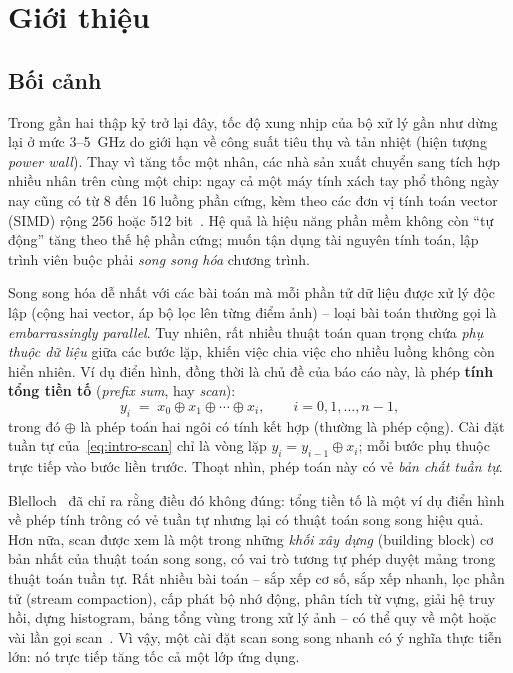 \chapter{Giới thiệu}
\label{ch:intro}

\section{Bối cảnh}

Trong gần hai thập kỷ trở lại đây, tốc độ xung nhịp của bộ xử lý gần như dừng lại ở mức
3--5~GHz do giới hạn về công suất tiêu thụ và tản nhiệt (hiện tượng \emph{power wall}).
Thay vì tăng tốc một nhân, các nhà sản xuất chuyển sang tích hợp nhiều nhân trên cùng một chip:
ngay cả một máy tính xách tay phổ thông ngày nay cũng có từ 8 đến 16 luồng phần cứng, kèm theo
các đơn vị tính toán vector (SIMD) rộng 256 hoặc 512 bit~\cite{hennessy2019}. Hệ quả là hiệu
năng phần mềm không còn ``tự động'' tăng theo thế hệ phần cứng; muốn tận dụng tài nguyên tính
toán, lập trình viên buộc phải \emph{song song hóa} chương trình.

Song song hóa dễ nhất với các bài toán mà mỗi phần tử dữ liệu được xử lý độc lập (cộng hai
vector, áp bộ lọc lên từng điểm ảnh) -- loại bài toán thường gọi là \emph{embarrassingly
parallel}. Tuy nhiên, rất nhiều thuật toán quan trọng chứa \emph{phụ thuộc dữ liệu} giữa các
bước lặp, khiến việc chia việc cho nhiều luồng không còn hiển nhiên. Ví dụ điển hình, đồng
thời là chủ đề của báo cáo này, là phép \textbf{tính tổng tiền tố} (\emph{prefix sum},
hay \emph{scan}):
\begin{equation}
  y_i \;=\; x_0 \oplus x_1 \oplus \cdots \oplus x_i, \qquad i = 0, 1, \ldots, n-1,
  \label{eq:intro-scan}
\end{equation}
trong đó \(\oplus\) là phép toán hai ngôi có tính kết hợp (thường là phép cộng). Cài đặt tuần
tự của~\eqref{eq:intro-scan} chỉ là vòng lặp \(y_i = y_{i-1} \oplus x_i\); mỗi bước phụ thuộc
trực tiếp vào bước liền trước. Thoạt nhìn, phép toán này có vẻ \emph{bản chất tuần tự}.

Blelloch~\cite{blelloch1990} đã chỉ ra rằng điều đó không đúng: tổng tiền tố là một ví dụ
điển hình về phép tính trông có vẻ tuần tự nhưng lại có thuật toán song song hiệu quả. Hơn
nữa, scan được xem là một trong những \emph{khối xây dựng} (building block) cơ bản nhất của
thuật toán song song, có vai trò tương tự phép duyệt mảng trong thuật toán tuần tự. Rất nhiều
bài toán -- sắp xếp cơ số, sắp xếp nhanh, lọc phần tử (stream compaction), cấp phát bộ nhớ
động, phân tích từ vựng, giải hệ truy hồi, dựng histogram, bảng tổng vùng trong xử lý ảnh --
có thể quy về một hoặc vài lần gọi scan~\cite{blelloch1990,harris2007,sengupta2007}. Vì vậy,
một cài đặt scan song song nhanh có ý nghĩa thực tiễn lớn: nó trực tiếp tăng tốc cả một lớp
ứng dụng.

